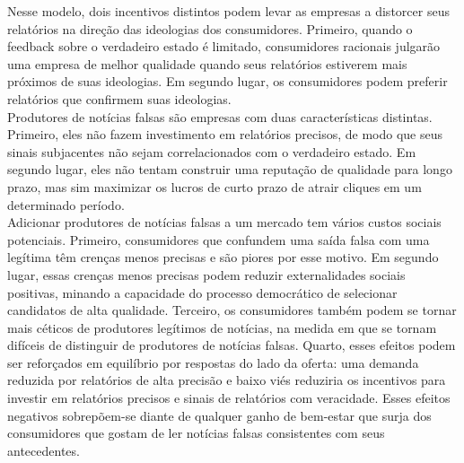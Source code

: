 Nesse modelo, dois incentivos distintos podem levar as empresas a distorcer seus relatórios na direção das ideologias dos consumidores. Primeiro, quando o feedback sobre o verdadeiro estado é limitado,
consumidores racionais julgarão uma empresa de melhor qualidade quando seus relatórios estiverem mais próximos
de suas ideologias. Em segundo lugar, os consumidores podem preferir relatórios que confirmem suas ideologias. \\

Produtores de notícias falsas são empresas com duas características distintas. Primeiro, eles não fazem
investimento em relatórios precisos, de modo que seus sinais subjacentes não sejam correlacionados com
o verdadeiro estado. Em segundo lugar, eles não tentam construir uma reputação de qualidade para longo prazo, mas sim maximizar os lucros de curto prazo de atrair cliques em um determinado período. \\

Adicionar produtores de notícias falsas a um mercado tem vários custos sociais potenciais. Primeiro,
consumidores que confundem uma saída falsa com uma legítima têm crenças menos precisas
e são piores por esse motivo. Em segundo lugar, essas crenças menos precisas podem reduzir
externalidades sociais positivas, minando a capacidade do processo democrático de
selecionar candidatos de alta qualidade. Terceiro, os consumidores também podem se tornar mais céticos
de produtores legítimos de notícias, na medida em que se tornam difíceis de distinguir
de produtores de notícias falsas. Quarto, esses efeitos podem ser reforçados em equilíbrio por
respostas do lado da oferta: uma demanda reduzida por relatórios de alta precisão e baixo viés
reduziria os incentivos para investir em relatórios precisos e sinais de relatórios com veracidade.
Esses efeitos negativos sobrepõem-se diante de qualquer ganho de bem-estar que surja dos consumidores
que gostam de ler notícias falsas consistentes com seus antecedentes.